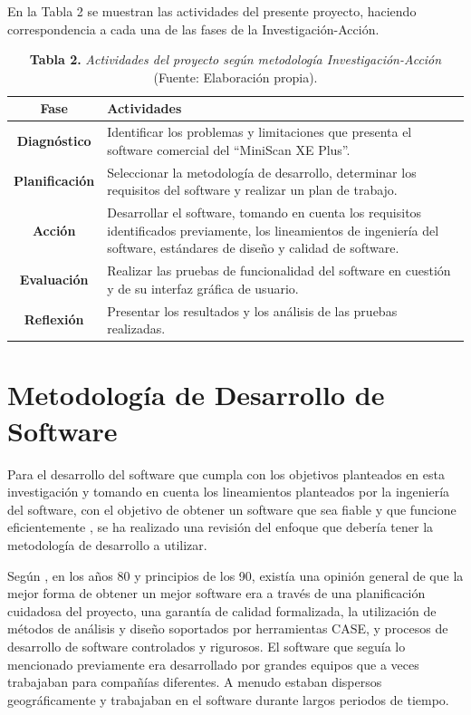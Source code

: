 En la Tabla 2 se muestran las actividades del presente proyecto, haciendo correspondencia a cada una de las fases de la Investigaci\'{o}n-Acci\'{o}n.
	\FloatBarrier %
	\begin{table}[htb]
		\small
		\centering
		\setlength{\extrarowheight}{5pt}
		\begin{tabulary}{15cm}{|c|L|}
			\hline
			\textbf{Fase} & \textbf{Actividades}\\ \hline
			\textbf{Diagn\'{o}stico} & Identificar los problemas y limitaciones que presenta el software comercial del ``MiniScan XE Plus''.\\ \hline
			\textbf{Planificaci\'{o}n} & Seleccionar la metodolog\'{i}a de desarrollo, determinar los requisitos del software y realizar un plan de trabajo.
\\ \hline
			\textbf{Acci\'{o}n} & Desarrollar el software, tomando en cuenta los requisitos identificados previamente, los lineamientos de ingenier\'{i}a del software, est\'{a}ndares de dise\~{n}o y calidad de software.\\ \hline
			\textbf{Evaluaci\'{o}n} & Realizar las pruebas de funcionalidad del software en cuesti\'{o}n y de su interfaz gr\'{a}fica de usuario.\\ \hline
			\textbf{Reflexi\'{o}n} & Presentar los resultados y los an\'{a}lisis de las pruebas realizadas.\\ \hline
	\end{tabulary}
		\caption{\textbf{Tabla 2.} \textit{Actividades del proyecto seg\'{u}n metodolog\'{i}a Investigaci\'{o}n-Acci\'{o}n }		(Fuente: Elaboración propia).}
	\end{table}
	\FloatBarrier %
	
	\section{Metodolog\'{i}a de Desarrollo de Software}
Para el desarrollo del software que cumpla con los objetivos planteados en esta investigaci\'{o}n y tomando en cuenta los lineamientos planteados por la ingenier\'{i}a del software, con el objetivo de obtener un software que sea fiable y que funcione eficientemente \cite{Pressman}, se ha realizado una revisi\'{o}n del enfoque que deber\'{i}a tener la metodolog\'{i}a de desarrollo a utilizar.

Seg\'{u}n \cite{Sommerville}, en los a\~{n}os 80 y principios de los 90, exist\'{i}a una opini\'{o}n general de que la mejor forma de obtener un mejor software era a trav\'{e}s de una planificaci\'{o}n cuidadosa del proyecto, una garant\'{i}a de calidad formalizada, la utilizaci\'{o}n de m\'{e}todos de an\'{a}lisis y dise\~{n}o soportados por herramientas CASE, y procesos de desarrollo de software controlados y rigurosos. El software que segu\'{i}a lo mencionado previamente era desarrollado por grandes equipos que a veces trabajaban para compa\~{n}\'{i}as diferentes. A menudo estaban dispersos geogr\'{a}ficamente y trabajaban en el software durante largos periodos de tiempo.

